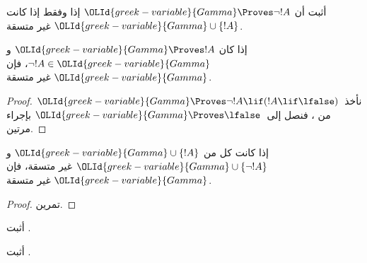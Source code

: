 \documentclass[../../../include/open-logic-section]{subfiles}
\begin{document}
\begin{prob}
أثبت أن ${\OLId{greek-variable}{Gamma}} \Proves \lnot !A$ إذا وفقط إذا كانت
${\OLId{greek-variable}{Gamma}} \cup \{!A\}$ غير متسقة.
\end{prob}

\begin{prop}
  إذا كان ${\OLId{greek-variable}{Gamma}} \Proves !A$ و$\lnot !A \in {\OLId{greek-variable}{Gamma}}$، فإن ${\OLId{greek-variable}{Gamma}}$
  غير متسقة.
\end{prop}

\begin{proof}
  نأخذ~${\OLId{greek-variable}{Gamma}} \Proves \lnot !A \lif (!A \lif \lfalse)$ من
  ، فنصل إلى~${\OLId{greek-variable}{Gamma}} \Proves \lfalse$
  بإجراء  مرتين.
\end{proof}


\begin{prop}
  إذا كانت كل من ${\OLId{greek-variable}{Gamma}} \cup \{!A\}$ و${\OLId{greek-variable}{Gamma}} \cup \{\lnot !A\}$
  غير متسقة، فإن ${\OLId{greek-variable}{Gamma}}$ غير متسقة.
\end{prop}

\begin{proof}
تمرين.
\end{proof}

\begin{prob}
  أثبت .
\end{prob}
\tagendprob

\begin{prob}
  أثبت .
\end{prob}
\tagendprob
\end{document}
